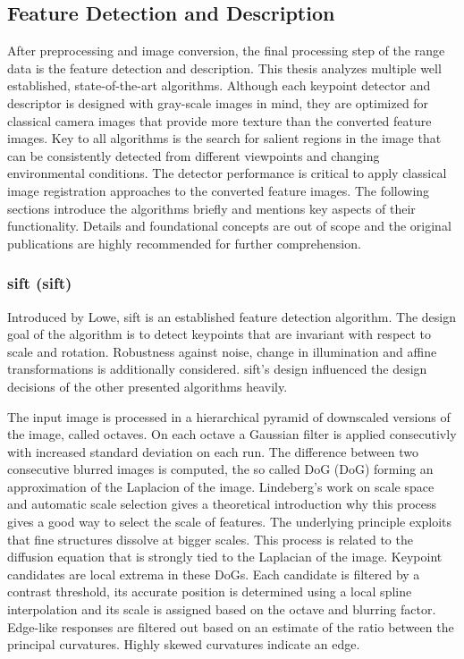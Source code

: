 \subsection{Feature Detection and Description}\label{sec:feature_algorithms}

After preprocessing and image conversion, the final processing step of the range data is the feature detection and description.
This thesis analyzes multiple well established, state-of-the-art algorithms.
Although each keypoint detector and descriptor is designed with gray-scale images in mind, they are optimized for classical camera images that provide more texture than the converted feature images.
Key to all algorithms is the search for salient regions in the image that can be consistently detected from different viewpoints and changing environmental conditions.
The detector performance is critical to apply classical image registration approaches to the converted feature images.
The following sections introduce the algorithms briefly and mentions key aspects of their functionality.
Details and foundational concepts are out of scope and the original publications are highly recommended for further comprehension.

\subsubsection{\acrshort{sift} (\acrlong{sift})}

Introduced by Lowe\cite{lowe_iccv99,lowe_ijcv04}, \acrshort{sift} is an established feature detection algorithm.
The design goal of the algorithm is to detect keypoints that are invariant with respect to scale and rotation.
Robustness against noise, change in illumination and affine transformations is additionally considered.
\acrshort{sift}'s design influenced the design decisions of the other presented algorithms heavily.

The input image is processed in a hierarchical pyramid of downscaled versions of the image, called octaves.
On each octave a Gaussian filter is applied consecutivly with increased standard deviation on each run.
The difference between two consecutive blurred images is computed, the so called \acrlong{DoG} (\acrshort{DoG}) forming an approximation of the Laplacion of the image.
Lindeberg's\cite{lindeberg_ijcv98} work on scale space and automatic scale selection gives a theoretical introduction why this process gives a good way to select the scale of features.
The underlying principle exploits that fine structures dissolve at bigger scales.
This process is related to the diffusion equation that is strongly tied to the Laplacian of the image.
Keypoint candidates are local extrema in these \acrshort{DoG}s.
Each candidate is filtered by a contrast threshold, its accurate position is determined using a local spline interpolation and its scale is assigned based on the octave and blurring factor.
Edge-like responses are filtered out based on an estimate of the ratio between the principal curvatures.
Highly skewed curvatures indicate an edge.

